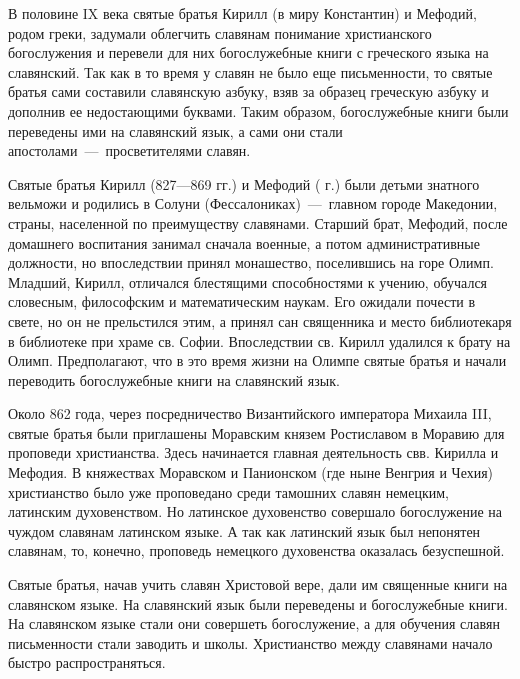 \documentclass[11pt,a4paper,oneside]{memoir}
\begin{document}
    В половине IX века святые братья Кирилл (в миру Константин) и Мефодий, родом греки, задумали облегчить славянам понимание христианского богослужения и перевели для них богослужебные книги с греческого языка на славянский. Так как в то время у славян не было еще письменности, то святые братья сами составили славянскую азбуку, взяв за образец греческую азбуку и дополнив ее недостающими буквами. Таким образом, богослужебные книги были переведены ими на славянский язык, а сами они стали апостолами~---~просветителями славян.
    
    Святые братья Кирилл (827---869 гг.) и Мефодий ( г.) были детьми знатного вельможи и родились в Солуни (Фессалониках)~---~главном городе Македонии, страны, населенной по преимуществу славянами. Старший брат, Мефодий, после домашнего воспитания занимал сначала военные, а потом административные должности, но впоследствии принял монашество, поселившись на горе Олимп. Младший, Кирилл, отличался блестящими способностями к учению, обучался словесным, философским и математическим наукам. Его ожидали почести в свете, но он не прельстился этим, а принял сан священника и место библиотекаря в библиотеке при храме св. Софии. Впоследствии св. Кирилл удалился к брату на Олимп. Предполагают, что в это время жизни на Олимпе святые братья и начали переводить богослужебные книги на славянский язык.
    
    Около 862 года, через посредничество Византийского императора Михаила III, святые братья были приглашены Моравским князем Ростиславом в Моравию для проповеди христианства. Здесь начинается главная деятельность свв. Кирилла и Мефодия. В княжествах Моравском и Панионском (где ныне Венгрия и Чехия) христианство было уже проповедано среди тамошних славян немецким, латинским духовенством. Но латинское духовенство совершало богослужение на чуждом славянам латинском языке. А так как латинский язык был непонятен славянам, то, конечно, проповедь немецкого духовенства оказалась безуспешной.
    
    Святые братья, начав учить славян Христовой вере, дали им священные книги на славянском языке. На славянский язык были переведены и богослужебные книги. На славянском языке стали они совершеть богослужение, а для обучения славян письменности стали заводить и школы. Христианство между славянами начало быстро распространяться.
    
\end{document}
